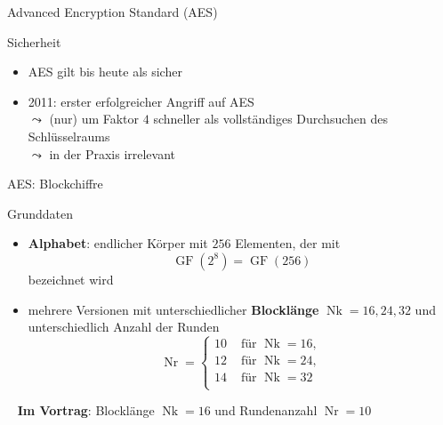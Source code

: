 \documentclass{beamer}
\newcommand{\Nk}{\operatorname {Nk}}
\newcommand{\Nr}{\operatorname {Nr}}
\newcommand{\GF}{\operatorname{GF}}
\theoremstyle{plain}
\begin{document}
\begin{frame}{Advanced Encryption Standard (AES)}{\ }
\begin{block}{Sicherheit}
\begin{itemize}
 \item AES gilt bis heute als sicher
 \item 2011: erster erfolgreicher Angriff auf AES\\
 $\leadsto$ (nur) um Faktor $4$ schneller als vollständiges Durchsuchen des Schlüsselraums\\
 $\leadsto$ in der Praxis irrelevant
\end{itemize}
\end{block}
\end{frame}


\begin{frame}{AES: Blockchiffre}{\ }

\begin{block}{Grunddaten}
 \begin{itemize}
  \item \textbf{Alphabet}: endlicher Körper mit $256$ Elementen, der mit 
  \[\GF(2^8) = \GF(256)\]
  bezeichnet wird
  \item mehrere Versionen mit unterschiedlicher \textbf{Blocklänge} $\Nk = 16, 24, 32$ und unterschiedlich Anzahl der Runden
  \[\Nr = \begin{cases}
         10 & \text{ für } \Nk = 16,\\
         12 & \text{ für } \Nk = 24,\\
         14 & \text{ für } \Nk = 32\\
        \end{cases}\]
 \end{itemize}
 \end{block}
 \pause
 \begin{alertblock}{\ }
 \textbf{Im Vortrag}: Blocklänge $\Nk = 16$ und Rundenanzahl $\Nr = 10$
 \end{alertblock}
\end{frame}
\end{document}
